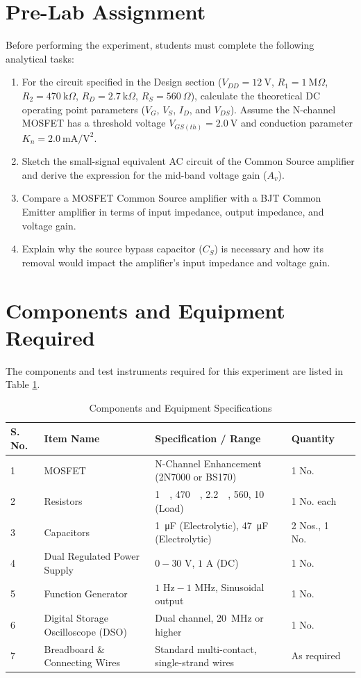 \section{Pre-Lab Assignment}
Before performing the experiment, students must complete the following analytical tasks:
\begin{enumerate}
	\item For the circuit specified in the Design section ($V_{DD} = \SI{12}{\volt}$, $R_1 = \SI{1}{\mega\Omega}$, $R_2 = \SI{470}{\kilo\Omega}$, $R_D = \SI{2.7}{\kilo\Omega}$, $R_S = \SI{560}{\Omega}$), calculate the theoretical DC operating point parameters ($V_G$, $V_S$, $I_D$, and $V_{DS}$). Assume the N-channel MOSFET has a threshold voltage $V_{GS(th)} = \SI{2.0}{\volt}$ and conduction parameter $K_n = \SI{2.0}{\milli\ampere\per\volt\squared}$.
	\item Sketch the small-signal equivalent AC circuit of the Common Source amplifier and derive the expression for the mid-band voltage gain ($A_v$).
	\item Compare a MOSFET Common Source amplifier with a BJT Common Emitter amplifier in terms of input impedance, output impedance, and voltage gain.
	\item Explain why the source bypass capacitor ($C_S$) is necessary and how its removal would impact the amplifier's input impedance and voltage gain.
\end{enumerate}

\section{Components and Equipment Required}
The components and test instruments required for this experiment are listed in Table \ref{tab:components_mosfet}.

\begin{table}[h!]
	\centering
	\caption{Components and Equipment Specifications}
	\label{tab:components_mosfet}
	\begin{tabularx}{\textwidth}{lXlll}
		\toprule
		\textbf{S. No.} & \textbf{Item Name} & \textbf{Specification / Range} & \textbf{Quantity} \\
		\midrule
		1 & MOSFET & N-Channel Enhancement (2N7000 or BS170) & 1 No. \\
		2 & Resistors & \SI{1}{\mega\Omega}, \SI{470}{\kilo\Omega}, \SI{2.2}{\kilo\Omega}, \SI{560}{\Omega}, \SI{10}{\kilo\Omega} (Load) & 1 No. each \\
		3 & Capacitors & \SI{1}{\micro\farad} (Electrolytic), \SI{47}{\micro\farad} (Electrolytic) & 2 Nos., 1 No. \\
		4 & Dual Regulated Power Supply & $0 - 30\text{ V}$, $1\text{ A}$ (DC) & 1 No. \\
		5 & Function Generator & $1\text{ Hz} - 1\text{ MHz}$, Sinusoidal output & 1 No. \\
		6 & Digital Storage Oscilloscope (DSO) & Dual channel, \SI{20}{\mega\hertz} or higher & 1 No. \\
		7 & Breadboard \& Connecting Wires & Standard multi-contact, single-strand wires & As required \\
		\bottomrule
	\end{tabularx}
\end{table}

